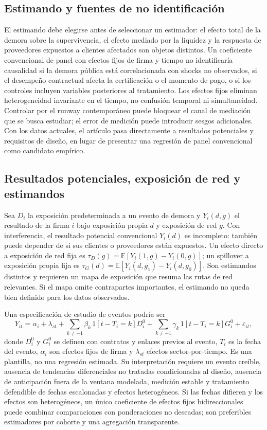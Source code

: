 \documentclass[11pt,a4paper]{article}
\begin{document}
\subsection{Estimando y fuentes de no identificación}
El estimando debe elegirse antes de seleccionar un estimador: el efecto total de la demora sobre la supervivencia, el efecto mediado por la liquidez y la respuesta de proveedores expuestos a clientes afectados son objetos distintos. Un coeficiente convencional de panel con efectos fijos de firma y tiempo no identificaría causalidad si la demora pública está correlacionada con shocks no observados, si el desempeño contractual afecta la certificación o el momento de pago, o si los controles incluyen variables posteriores al tratamiento. Los efectos fijos eliminan heterogeneidad invariante en el tiempo, no confusión temporal ni simultaneidad. Controlar por el runway contemporáneo puede bloquear el canal de mediación que se busca estudiar; el error de medición puede introducir sesgos adicionales. Con los datos actuales, el artículo pasa directamente a resultados potenciales y requisitos de diseño, en lugar de presentar una regresión de panel convencional como candidato empírico.

\subsection{Resultados potenciales, exposición de red y estimandos}
Sea $D_i$ la exposición predeterminada a un evento de demora y $Y_i(d,g)$ el resultado de la firma $i$ bajo exposición propia $d$ y exposición de red $g$. Con interferencia, el resultado potencial convencional $Y_i(d)$ es incompleto: también puede depender de si sus clientes o proveedores están expuestos. Un efecto directo a exposición de red fija es $\tau_D(g)=\mathbb E[Y_i(1,g)-Y_i(0,g)]$; un spillover a exposición propia fija es $\tau_G(d)=\mathbb E[Y_i(d,g_1)-Y_i(d,g_0)]$. Son estimandos distintos y requieren un mapa de exposición que resuma las rutas de red relevantes. Si el mapa omite contrapartes importantes, el estimando no queda bien definido para los datos observados.

Una especificación de estudio de eventos podría ser
\begin{equation}
Y_{it}=\alpha_i+\lambda_{st}+\sum_{k\ne-1}\beta_k\,1[t-T_i=k]D_i^0+\sum_{k\ne-1}\gamma_k\,1[t-T_i=k]G_i^0+\varepsilon_{it},
\label{eq:event_study_network}
\end{equation}
donde $D_i^0$ y $G_i^0$ se definen con contratos y enlaces previos al evento, $T_i$ es la fecha del evento, $\alpha_i$ son efectos fijos de firma y $\lambda_{st}$ efectos sector-por-tiempo. Es una plantilla, no una regresión estimada. Su interpretación requiere un evento creíble, ausencia de tendencias diferenciales no tratadas condicionadas al diseño, ausencia de anticipación fuera de la ventana modelada, medición estable y tratamiento defendible de fechas escalonadas y efectos heterogéneos. Si las fechas difieren y los efectos son heterogéneos, un único coeficiente de efectos fijos bidireccionales puede combinar comparaciones con ponderaciones no deseadas; son preferibles estimadores por cohorte y una agregación transparente.
\end{document}
